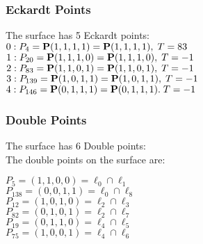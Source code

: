 \documentclass{article}
\newcommand{\bP}{{\bf P}}
\begin{document}
{\subsubsection*{Eckardt Points}
The surface has 5 Eckardt points:\\
$0 : P_{4}=\bP(1, 1, 1, 1) = \bP(1, 1, 1, 1),\; T= 83$\\
$1 : P_{20}=\bP(1, 1, 1, 0) = \bP(1, 1, 1, 0),\; T= -1$\\
$2 : P_{83}=\bP(1, 1, 0, 1) = \bP(1, 1, 0, 1),\; T= -1$\\
$3 : P_{139}=\bP(1, 0, 1, 1) = \bP(1, 0, 1, 1),\; T= -1$\\
$4 : P_{146}=\bP(0, 1, 1, 1) = \bP(0, 1, 1, 1).\; T= -1$\\
\subsubsection*{Double Points}
The surface has 6 Double points:\\
The double points on the surface are:\\
\begin{multicols}{2}
\noindent
$P_{5} = ( 1, 1, 0, 0 ) = \ell_{0} \cap \ell_{1} $\\
$P_{138} = ( 0, 0, 1, 1 ) = \ell_{0} \cap \ell_{8} $\\
$P_{12} = ( 1, 0, 1, 0 ) = \ell_{2} \cap \ell_{3} $\\
$P_{82} = ( 0, 1, 0, 1 ) = \ell_{2} \cap \ell_{7} $\\
$P_{19} = ( 0, 1, 1, 0 ) = \ell_{4} \cap \ell_{5} $\\
$P_{75} = ( 1, 0, 0, 1 ) = \ell_{4} \cap \ell_{6} $\\
\end{multicols}
}
\end{document}

